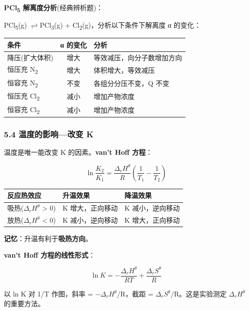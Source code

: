 \documentclass[a4paper,11pt]{ctexart}
\newcounter{none}
\newcommand{\箭}{\ensuremath{\rightarrow}}
\newcommand{\左箭}{\ensuremath{\leftarrow}}
\newcommand{\上箭}{\ensuremath{\uparrow}}
\newcommand{\下箭}{\ensuremath{\downarrow}}
\newcommand{\衡}{\ensuremath{\rightleftharpoons}}
\newcommand{\双箭}{\ensuremath{\leftrightarrow}}
\newcommand{\约等于}{\ensuremath{\approx}}
\newcommand{\小于等于}{\ensuremath{\leq}}
\newcommand{\大于等于}{\ensuremath{\geq}}
\newcommand{\不等于}{\ensuremath{\neq}}
\newcommand{\西格马}{\ensuremath{\sigma}}
\newcommand{\派}{\ensuremath{\pi}}
\begin{document}
\textbf{PCl\textsubscript{5} 解离度分析}(经典辨析题)：

PCl\textsubscript{5}(g) \衡 PCl\textsubscript{3}(g) + Cl\textsubscript{2}(g)，分析以下条件下解离度 α 的变化：

{\def\LTcaptype{none} %
\begin{longtable}[]{@{}lcl@{}}
\toprule\noalign{}
条件 & α 的变化 & 分析 \\
\midrule\noalign{}
\endhead
\bottomrule\noalign{}
\endlastfoot
降压(扩大体积) & 增大 & 等效减压，向分子数增加方向 \\
恒压充 N\textsubscript{2} & 增大 & 体积增大，等效减压 \\
恒容充 N\textsubscript{2} & 不变 & 各组分分压不变，Q 不变 \\
恒压充 Cl\textsubscript{2} & 减小 & 增加产物浓度 \\
恒容充 Cl\textsubscript{2} & 减小 & 增加产物浓度 \\
\end{longtable}
}

\subsubsection{5.4 温度的影响---改变 K}\label{ux6e29ux5ea6ux7684ux5f71ux54cdux6539ux53d8-k}

温度是唯一能改变 K 的因素。\textbf{van't Hoff 方程}：

\[
\boxed{\ln\frac{K_2}{K_1} = \frac{\Delta_r H^\theta}{R}\left(\frac{1}{T_1} - \frac{1}{T_2}\right)}
\]

{\def\LTcaptype{none} %
\begin{longtable}[]{@{}lll@{}}
\toprule\noalign{}
反应热效应 & 升温效果 & 降温效果 \\
\midrule\noalign{}
\endhead
\bottomrule\noalign{}
\endlastfoot
吸热(\(\Delta_r H^\theta\) \textgreater{} 0) & K 增大，正向移动 & K 减小，逆向移动 \\
放热(\(\Delta_r H^\theta\) \textless{} 0) & K 减小，逆向移动 & K 增大，正向移动 \\
\end{longtable}
}

\textbf{记忆}：升温有利于\textbf{吸热方向}。

\textbf{van't Hoff 方程的线性形式}：

\[
\ln K = -\frac{\Delta_r H^\theta}{RT} + \frac{\Delta_r S^\theta}{R}
\]

以 ln K 对 1/T 作图，斜率 = −\(\Delta_r H^\theta\)/R，截距 = \(\Delta_r S^\theta\)/R。这是实验测定 \(\Delta_r H^\theta\) 的重要方法。
\end{document}
